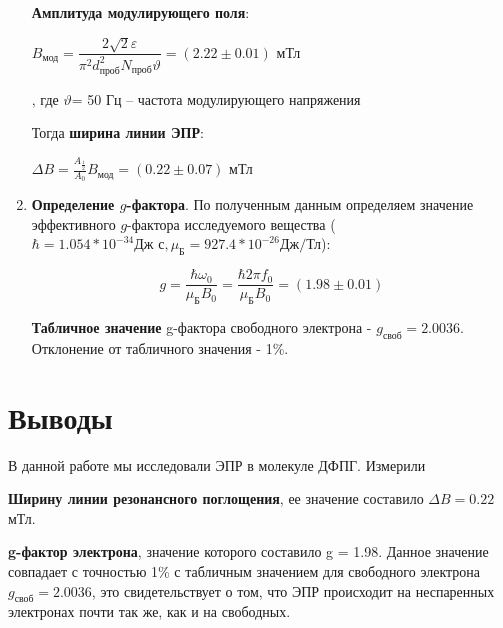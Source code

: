 \documentclass[a4paper,12pt]{article}
\begin{document}
\begin{enumerate}
     \textbf{Амплитуда модулирующего поля}:
    
    $B_{\text{мод}} = \dfrac{2\sqrt{2} \varepsilon }{\pi^2 d^2_{\text{проб}} N_{\text{проб}}\vartheta } = (2.22 \pm 0.01)$ мТл
    
    , где $\vartheta $= 50 Гц -- частота модулирующего напряжения 


  Тогда  \textbf{ширина линии ЭПР}:
  
  $\Delta B = \frac{A_{\frac{1}{2}}}{A_{0}} B_{\text{мод}} = (0.22 \pm 0.07)$ мТл
    
    
		\item \textbf{Определение $g$-фактора}. По полученным данным определяем значение эффективного $g$-фактора исследуемого вещества ($\hbar = 1.054 * 10^{-34} \text{Дж с}, \mu_\text{Б} = 927.4 * 10^{-26} \text{Дж/Тл}$):
		
		\[g = \frac{\hbar \omega_0}{\mu_\text{Б} B_0} = \frac{\hbar 2 \pi f_0}{\mu_\text{Б} B_0} = (1.98 \pm 0.01)\]

	
\textbf{Табличное значение} g-фактора свободного электрона - $g_{\text{своб}} = 2.0036$. Отклонение от табличного значения - 1\%.
	\end{enumerate}



\section{Выводы}

В данной работе мы исследовали ЭПР в молекуле ДФПГ. Измерили 

\textbf{Ширину линии резонансного поглощения}, ее значение составило $\Delta B = 0.22$ мТл. 

\textbf{g-фактор электрона}, значение которого составило g = 1.98. Данное значение совпадает с точностью 1\% с табличным значением для свободного электрона $g_{\text{своб}} = 2.0036$, это свидетельствует о том, что ЭПР происходит на неспаренных электронах почти так же, как и на свободных.
\end{document}
